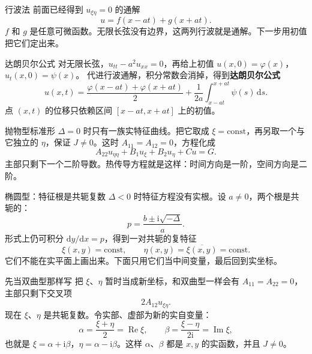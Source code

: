\documentclass[fontset=windows, chinese, 10pt, xcolor=dvipsnames]{beamer}
\begin{document}
\begin{frame}{行波法}
  前面已经得到 $u_{\xi\eta}=0$ 的通解
  \begin{equation*}
    u=f(x-at)+g(x+at).
  \end{equation*}
  $f$ 和 $g$ 是任意可微函数。无限长弦没有边界，这两列行波就是通解。下一步用初值把它们定出来。
\end{frame}

\begin{frame}{达朗贝尔公式}
  对无限长弦，$u_{tt}-a^2u_{xx}=0$，再给上初值
  $u(x,0)=\varphi(x)$，$u_t(x,0)=\psi(x)$。
  代进行波通解，积分常数会消掉，得到\textbf{达朗贝尔公式}
  \begin{equation*}
    u(x,t)
    =\frac{\varphi(x-at)+\varphi(x+at)}{2}
    +\frac{1}{2a}\int_{x-at}^{x+at}\psi(s)\,\mathrm{d}s.
  \end{equation*}
  点 $(x,t)$ 的位移只依赖区间 $[x-at,x+at]$ 上的初值。%
\end{frame}

\begin{frame}{抛物型标准形}
  $\Delta=0$ 时只有一族实特征曲线。把它取成 $\xi=\mathrm{const}$，再另取一个与它独立的 $\eta$，保证 $J\neq 0$。这时 $A_{11}=A_{12}=0$，方程化成
  \begin{equation*}
    A_{22}u_{\eta\eta}+B_1u_\xi+B_2u_\eta+Cu=G.
  \end{equation*}
  主部只剩下一个二阶导数。热传导方程就是这样：时间方向是一阶，空间方向是二阶。
\end{frame}

\begin{frame}{椭圆型：特征根是共轭复数}
  $\Delta<0$ 时特征方程没有实根。设 $a\neq 0$，两个根是共轭的：
  \begin{equation*}
    p=\frac{b\pm\mathrm{i}\sqrt{-\Delta}}{a}.
  \end{equation*}
  形式上仍可积分 $\mathrm{d}y/\mathrm{d}x=p$，得到一对共轭的复特征
  \begin{equation*}
    \xi(x,y)=\mathrm{const},
    \qquad
    \eta(x,y)=\overline{\xi(x,y)}=\mathrm{const}.
  \end{equation*}
  它们不能在实平面上画出来。下面只用它们当中间变量，最后回到实坐标。
\end{frame}

\begin{frame}{先当双曲型那样写}
  把 $\xi$、$\eta$ 暂时当成新坐标，和双曲型一样会有 $A_{11}=A_{22}=0$，主部只剩下交叉项
  \begin{equation*}
    2A_{12}u_{\xi\eta}.
  \end{equation*}
  现在 $\xi$、$\eta$ 是共轭复数。令实部、虚部为新的实自变量：
  \begin{equation*}
    \alpha=\frac{\xi+\eta}{2}=\operatorname{Re}\xi,
    \qquad
    \beta=\frac{\xi-\eta}{2\mathrm{i}}=\operatorname{Im}\xi,
  \end{equation*}
  也就是 $\xi=\alpha+\mathrm{i}\beta$，$\eta=\alpha-\mathrm{i}\beta$。这样 $\alpha$、$\beta$ 都是 $x,y$ 的实函数，并且 $J\neq 0$。
\end{frame}
\end{document}
